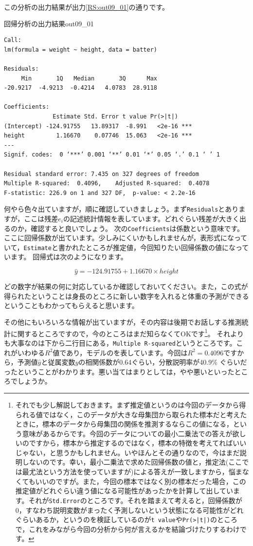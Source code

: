 \documentclass{ltjsbook}
\begin{document}
この分析の出力結果が出力\ref{RS:out09_01}の通りです。

\begin{Rscreen}{回帰分析の出力結果}{out09_01}
	\begin{verbatim}
Call:
lm(formula = weight ~ height, data = batter)

Residuals:
     Min       1Q   Median       3Q      Max 
-20.9217  -4.9213  -0.4214   4.0783  28.9118 

Coefficients:
              Estimate Std. Error t value Pr(>|t|)    
(Intercept) -124.91755   13.89317  -8.991   <2e-16 ***
height         1.16670    0.07746  15.063   <2e-16 ***
---
Signif. codes:  0 ‘***’ 0.001 ‘**’ 0.01 ‘*’ 0.05 ‘.’ 0.1 ‘ ’ 1

Residual standard error: 7.435 on 327 degrees of freedom
Multiple R-squared:  0.4096,	Adjusted R-squared:  0.4078 
F-statistic: 226.9 on 1 and 327 DF,  p-value: < 2.2e-16
    \end{verbatim}
\end{Rscreen}

何やら色々出ていますが，順に確認していきましょう。まず\texttt{Residuals}とありますが，ここは残差$e_i$の記述統計情報を表しています。どれぐらい残差が大きく出るのか，確認すると良いでしょう。
次の\texttt{Coefficients}は係数という意味です。ここに回帰係数が出ています。少しみにくいかもしれませんが，表形式になっていて，\texttt{Estimate}と書かれたところが推定値，今回知りたい回帰係数の値になっています。
回帰式は次のようになります。

\[ \hat{y} = -124.91755 + 1.16670 \times height \]

どの数字が結果の何に対応しているか確認しておいてください。また，この式が得られたということは身長のところに新しい数字を入れると体重の予測ができるということもわかってもらえると思います。

その他にもいろいろな情報が出ていますが，その内容は後期でお話しする推測統計に関するところですので，今のところはまだ知らなくてOKです\footnote{それでも少し解説しておきます。まず推定値というのは今回のデータから得られる値ではなく，このデータが大きな母集団から取られた標本だと考えたときに，標本のデータから母集団の関係を推測するならこの値になる，という意味があるからです。今回のデータについての最小二乗法での答えが欲しいのですから，標本から推定するのではなく，標本の特徴を考えてればいいじゃない，と思うかもしれません。いやほんとその通りなので，今はまだ説明しないのです。幸い，最小二乗法で求めた回帰係数の値と，推定法(ここでは最尤法という方法を使っていますが)による答えが一致しますから，悩まなくてもいいのですが。また，今回の標本ではなく別の標本だった場合，この推定値がどれぐらい違う値になる可能性があったかを計算して出しています。それが\texttt{Std.Error}のところです。それを踏まえて考えると，回帰係数が0，すなわち説明変数がまったく予測しないという状態になる可能性がどれぐらいあるか，というのを検証しているのが\texttt{t value}や\texttt{Pr(>|t|)}のところで，これをみながら今回の分析から何が言えるかを結論づけたりするわけです。}。
それよりも大事なのは下から二行目にある，\texttt{Multiple R-squared}というところです。これがいわゆる$R^2$値であり，モデルのを表しています。今回は$R^2=0.4096$ですから，予測値$\hat{y}$と従属変数$y$の相関係数が0.64ぐらい，分散説明率が40.9\% ぐらいだったということがわかります。悪い当てはまりとしては，やや悪いといったところでしょうか。
\end{document}
